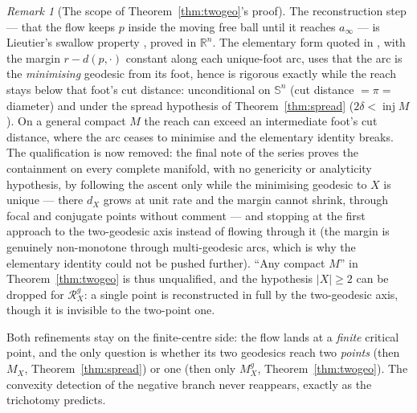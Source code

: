 \documentclass[11pt]{article}
\theoremstyle{remark}
\newtheorem{remark}[theorem]{Remark}
\newcommand{\R}{\mathbb{R}}
\newcommand{\X}{X}
\newcommand{\Mx}{M_{\X}}
\newcommand{\Rx}{\mathcal{R}_{\X}}
\newcommand{\inj}{\operatorname{inj}}
\newcommand{\Sn}{\mathbb{S}^{n}}
\begin{document}
\begin{remark}[The scope of Theorem~\ref{thm:twogeo}'s
proof]\label{rem:twogeo-caveat}
The reconstruction step --- that the flow keeps $p$ inside the moving free
ball until it reaches $a_{\infty}$ --- is Lieutier's swallow property
\cite{Lie}, proved in $\R^{n}$. The elementary form quoted in
\cite[Thm.~8.3]{Sph}, with the margin $r-d(p,\cdot)$ constant along each
unique-foot arc, uses that the arc is the \emph{minimising} geodesic from
its foot, hence is rigorous exactly while the reach stays below that foot's
cut distance: unconditional on $\Sn$ (cut distance $=\pi=$ diameter) and
under the spread hypothesis of Theorem~\ref{thm:spread} ($2\delta<\inj M$).
On a general compact $M$ the reach can exceed an intermediate foot's cut
distance, where the arc ceases to minimise and the elementary identity
breaks. The qualification is now removed: the final note of the series
\cite[Thm.~3.1, Cor.~3.2]{C} proves the containment on every complete
manifold, with no genericity or analyticity hypothesis, by following the
ascent only while the minimising geodesic to $\X$ is unique --- there
$d_{\X}$ grows at unit rate and the margin cannot shrink, through focal
and conjugate points without comment --- and stopping at the first
approach to the two-geodesic axis instead of flowing through it (the
margin is genuinely non-monotone through multi-geodesic arcs, which is
why the elementary identity could not be pushed further). ``Any compact
$M$'' in Theorem~\ref{thm:twogeo} is thus unqualified, and the hypothesis
$|\X|\ge2$ can be dropped for $\Rx^{g}$: a single point is reconstructed
in full by the two-geodesic axis, though it is invisible to the two-point
one.
\end{remark}

Both refinements stay on the finite-centre side: the flow lands at a
\emph{finite} critical point, and the only question is whether its two
geodesics reach two \emph{points} (then $\Mx$, Theorem~\ref{thm:spread})
or one (then only $\Mx^{g}$, Theorem~\ref{thm:twogeo}). The convexity
detection of the negative branch never reappears, exactly as the
trichotomy predicts.
\end{document}
